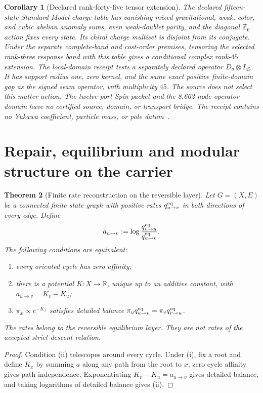 \documentclass[11pt]{article}
\newtheorem{theorem}{Theorem}[section]
\newtheorem{corollary}[theorem]{Corollary}
\theoremstyle{remark}
\theoremstyle{plain}
\begin{document}
\begin{corollary}[Declared rank-forty-five tensor extension]
\label{cor:finite-rank45-matter-attachment}
The declared fifteen-state Standard Model charge table has vanishing mixed gravitational,
weak, color, and cubic abelian anomaly sums, even weak-doublet parity, and the
diagonal \(\mathbb Z_6\) action fixes every state. Its chiral charge multiset is
disjoint from its conjugate. Under the separate complete-band and cost-order
premises, tensoring the selected rank-three response band with this table gives
a conditional complex rank-\(45\) extension. The local-domain receipt tests a
separately declared operator \(D_\sigma\otimes I_{45}\). It has support radius
one, zero kernel, and the same exact positive finite-domain gap as the signed
seam operator, with multiplicity \(45\). The source does not select this matter
action. The twelve-port Spin packet and the 8,662-node operator domain have no
certified source, domain, or transport bridge. The receipt contains no Yukawa
coefficient, particle mass, or pole datum~\cite{ophfpe}.
\end{corollary}

\section{Repair, equilibrium and modular structure on the carrier}
\label{sec:repair-equilibrium-modular}

\begin{theorem}[Finite rate reconstruction on the reversible layer]
Let \(G=(X,E)\) be a connected finite state graph with positive rates
\(q_{u\to v}^{\rm eq}\) in both directions of every edge. Define
\[
a_{u\to v}:=\log\frac{q_{v\to u}^{\rm eq}}{q_{u\to v}^{\rm eq}}.
\]
The following conditions are equivalent:
\begin{enumerate}[label=\textup{(\roman*)},leftmargin=2em]
\item every oriented cycle has zero affinity;
\item there is a potential \(K:X\to\mathbb R\), unique up to an additive constant, with
\(a_{u\to v}=K_v-K_u\);
\item \(\pi_x\propto e^{-K_x}\) satisfies detailed balance
\(\pi_uq_{u\to v}^{\rm eq}=\pi_vq_{v\to u}^{\rm eq}\).
\end{enumerate}
The rates belong to the reversible equilibrium layer. They are not rates of the accepted
strict-descent relation.
\end{theorem}

\begin{proof}
Condition \textup{(ii)} telescopes around every cycle. Under \textup{(i)}, fix a root and define
\(K_x\) by summing \(a\) along any path from the root to \(x\); zero cycle affinity gives path
independence. Exponentiating \(K_v-K_u=a_{u\to v}\) gives detailed balance, and taking logarithms
of detailed balance gives \textup{(ii)}.
\end{proof}
\end{document}
